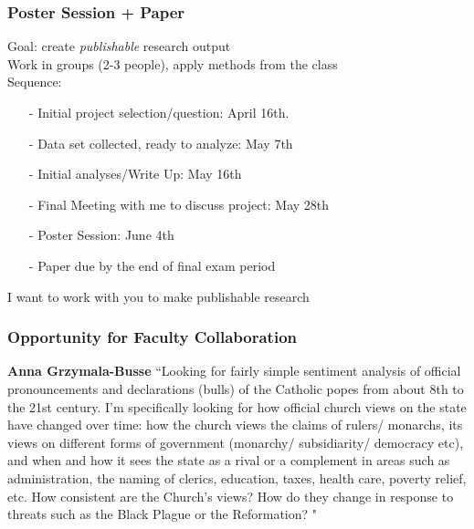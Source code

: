 \documentclass{beamer}
\numberwithin{equation}{section}
\begin{document}
\begin{frame}
\frametitle{Poster Session + Paper}

Goal: create \emph{publishable} research output\\
Work in groups (2-3 people), apply methods from the class \\
Sequence:
\begin{itemize}
\item[-] Initial project selection/question: April 16th.  
\item[-] Data set collected, ready to analyze: May 7th
\item[-] Initial analyses/Write Up: May 16th
\item[-] Final Meeting with me to discuss project:  May 28th
\item[-] \alert{Poster Session}: June 4th
\item[-] Paper due by the end of final exam period
\end{itemize} 


\alert{I want to work with you to make publishable research}



\end{frame}

\begin{frame}
\frametitle{Opportunity for Faculty Collaboration}

\textbf{Anna Grzymala-Busse}
 ``Looking for fairly simple sentiment analysis of official pronouncements and declarations (bulls) of the Catholic popes from about 8th to the 21st century. I’m specifically looking for how official church views on the state have changed over time: how the church views the claims of rulers/ monarchs, its views on different forms of government (monarchy/ subsidiarity/ democracy etc), and when and how it sees the state as a rival or a complement in areas such as administration, the naming of clerics, education, taxes, health care, poverty relief, etc. How consistent are the Church’s views? How do they change in response to threats such as the Black Plague or the Reformation? "


\end{frame}
\end{document}
